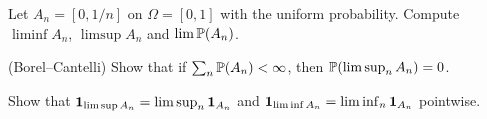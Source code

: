 \begin{notechapter}
\begin{exercise}\label{convergence-of-events:exr:1}
Let $A_n = [0, 1/n]$ on $\Omega = [0,1]$ with the uniform probability. Compute
$\liminf A_n$, $\limsup A_n$ and $\lim\mathbb{P}(A_n)$.
\end{exercise}

\begin{exercise}\label{convergence-of-events:exr:2}
(Borel--Cantelli) Show that if $\sum_n\mathbb{P}(A_n)<\infty$, then
$\mathbb{P}(\limsup_nA_n) = 0$.
\end{exercise}

\begin{exercise}\label{convergence-of-events:exr:3}
Show that $\mathbf{1}_{\limsup A_n} = \limsup_n\mathbf{1}_{A_n}$ and
$\mathbf{1}_{\liminf A_n} = \liminf_n\mathbf{1}_{A_n}$ pointwise.
\end{exercise}
\end{notechapter}
